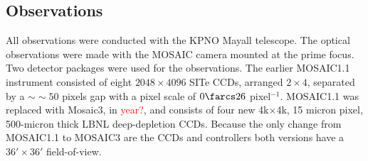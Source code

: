 \documentclass[apj, revtex4]{emulateapj}
\newcommand{\editorial}[1]{\textcolor{red}{#1}}
\begin{document}


\subsection{Observations}\label{sec: observations}
All observations were conducted with the KPNO Mayall telescope. The optical observations were made with the MOSAIC camera mounted at the prime focus. Two detector packages were used for the observations. The earlier MOSAIC1.1 instrument consisted of eight $2048\times4096$ SITe CCDs, arranged $2\times4$, separated by a $∼\sim50$ pixels gap with a pixel scale of $0\farcs26$ pixel$^{-1}$. MOSAIC1.1 was replaced with Mosaic3, in \editorial{year?},  and consists of four new 4k$\times$4k, 15 micron pixel, 500-micron thick LBNL deep-depletion CCDs. Because the only change from MOSAIC1.1 to MOSAIC3 are the CCDs and controllers both versions have a $36' \times 36'$ field-of-view.
\end{document}
